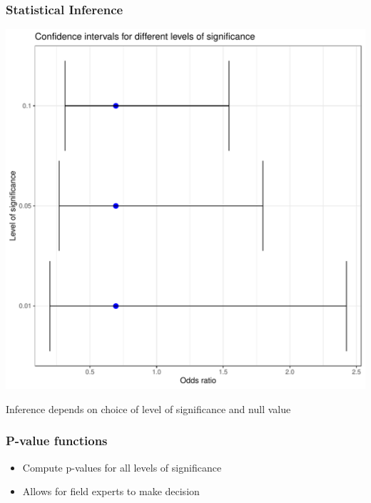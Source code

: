 \documentclass{beamer}
\begin{document}
\begin{frame}
  \frametitle{Statistical Inference}
  \includegraphics[scale = 0.4]{cis}
 
  Inference depends on choice of level of significance and null value
\end{frame}

\begin{frame}
  \frametitle{P-value functions}
  \begin{itemize}
    \item Compute p-values for all levels of significance
    \item Allows for field experts to make decision
  \end{itemize}
\end{frame}
\end{document}
